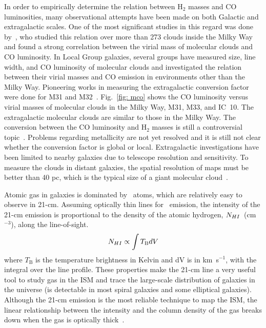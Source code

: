 In order to empirically determine the relation between H$_2$ masses and CO luminosities, many observational attempts have been made on both Galactic and extragalactic scales. 
One of the most significant studies in this regard was done by~\cite{Solomon87}, who studied this relation over more than 273 clouds inside the Milky Way and found a strong correlation between the virial mass of molecular clouds and CO luminosity. 
In Local Group galaxies, several groups have measured size, line width, and CO luminosity of molecular clouds and investigated the relation between  their virial masses and CO emission in environments other than the Milky Way. 
Pioneering works in measuring the extragalactic conversion factor were done for M31 and M32~\citep[e.g.,][]{Wilson89, Wilson90}. 
Fig.~\ref{fig: mco} shows the CO luminosity versus virial masses of molecular clouds in the Milky Way, M31, M33, and IC~10. 
The extragalactic molecular clouds are similar to those in the Milky Way. 
The conversion between the CO luminosity and H$_2$ masses is still a controversial topic~\citep[e.g.][]{Narayanan11, Bolato13, Sandstrom13}.
Problems regarding metallicity are not yet resolved and it is still not clear whether the conversion factor is global or local. 
Extragalactic investigations have been limited to nearby galaxies due to telescope resolution and sensitivity. 
To measure the clouds in distant galaxies, the spatial resolution of maps must be better than 40 pc, which is the typical size of a giant molecular cloud~\citep[e.g.][and references therein]{Young91,Bolato13}. 

Atomic gas in galaxies is dominated by \hi~atoms, which are relatively easy to observe in 21-cm.
Assuming optically thin lines for \hi~emission, the intensity of the 21-cm emission is proportional to the density of the atomic hydrogen, $N_{H {\sc I}}$~(cm$^{-3}$), along the line-of-sight. %
\begin{equation}
N_{H {\sc I}}  \propto \int T_{\mathrm B} dV
\end{equation}
where $T_{\mathrm B}$ is the temperature brightness in Kelvin and dV is in km~s$^{-1}$, with the integral over the line profile. 
These properties make the 21-cm line a very useful tool to study gas in the ISM and trace the large-scale distribution of galaxies in the universe (\hi is detectable in most spiral galaxies and some elliptical galaxies).
Although the 21-cm emission is the most reliable technique to map the ISM, the linear relationship between the intensity and the column density of the gas breaks down when the gas is optically thick~\citep{Braun09}. 

